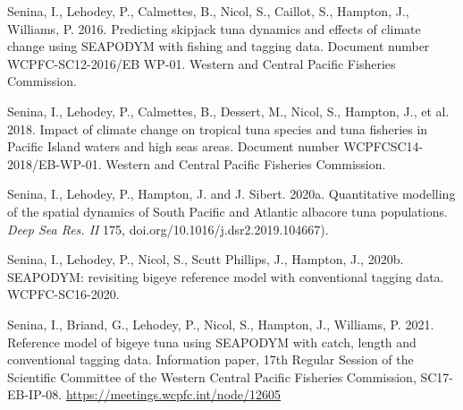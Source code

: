 \begin{thebibliography}{}
 Senina, I., Lehodey, P., Calmettes, B., Nicol, S., Caillot, S., Hampton, J., Williams, P. 2016. Predicting skipjack tuna dynamics and effects of climate change using SEAPODYM with fishing and tagging data. Document number WCPFC-SC12-2016/EB WP-01. Western and Central Pacific Fisheries Commission. 

 Senina, I., Lehodey, P., Calmettes, B., Dessert, M., Nicol, S., Hampton, J., et al. 2018. Impact of climate change on tropical tuna species and tuna fisheries in Pacific Island waters and high seas areas. Document number WCPFCSC14-2018/EB-WP-01. Western and Central Pacific Fisheries Commission.

 Senina, I., Lehodey, P., Hampton, J. and J. Sibert. 2020a. Quantitative modelling of the spatial dynamics of South Pacific and Atlantic albacore tuna populations. \textit{Deep Sea Res. II}  175,  doi.org/10.1016/j.dsr2.2019.104667).  

%
 Senina, I., Lehodey, P., Nicol, S., Scutt Phillips, J., Hampton, J., 2020b. SEAPODYM: revisiting bigeye reference model with conventional tagging data. WCPFC-SC16-2020.

 Senina, I., Briand, G., Lehodey, P., Nicol, S., Hampton, J., Williams, P. 2021. Reference model of bigeye tuna using SEAPODYM with catch, length and conventional tagging data. Information paper, 17th Regular Session of the Scientific Committee of the Western Central Pacific Fisheries Commission, SC17-EB-IP-08. \url{https://meetings.wcpfc.int/node/12605}


\end{thebibliography}
